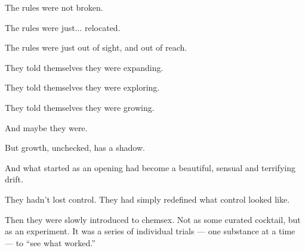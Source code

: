 The rules were not broken.

The rules were just... relocated.

The rules were just out of sight, and out of reach.

They told themselves they were expanding. 

They told themselves they were exploring. 

They told themselves they were growing.

And maybe they were.

But growth, unchecked, has a shadow.

And what started as an opening had become a beautiful, sensual and terrifying drift.

They hadn’t lost control.
They had simply redefined what control looked like.

Then they were slowly introduced to chemsex. Not as some curated cocktail, but as an experiment. 
It was a series of individual trials --- one substance at a time --- to ``see what worked.'' 

\medskip

